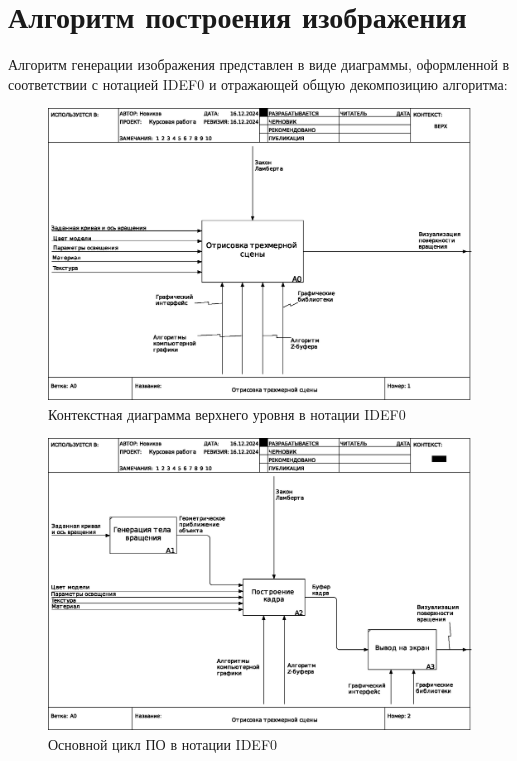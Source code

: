 \section{Алгоритм построения изображения}
Алгоритм генерации изображения представлен в виде диаграммы, оформленной в соответствии с нотацией IDEF0 и отражающей общую декомпозицию алгоритма:
\begin{figure}[H]
	\centering
	\includegraphics[scale=0.8]{img/01_A0.eps}
	\caption{Контекстная диаграмма верхнего уровня в нотации IDEF0}
	\label{fig:viewer}
\end{figure}

\begin{figure}[H]
	\centering
	\includegraphics[scale=0.8]{img/02_A0.eps}
	\caption{Основной цикл ПО в нотации IDEF0}
	\label{fig:viewer}
\end{figure}

